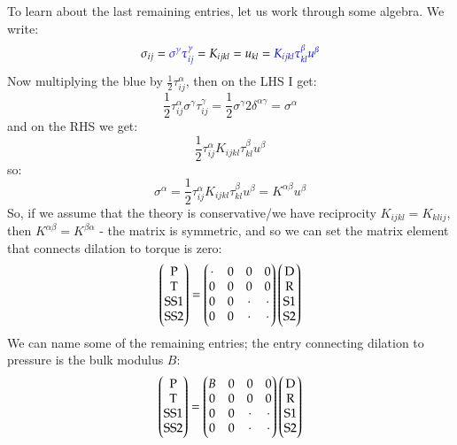 To learn about the last remaining entries, let us work through some algebra. We write:
\begin{equation}
    \sigma_{ij} = \textcolor{blue}{\sigma^\gamma \tau^\gamma_{ij}} = K_{ijkl} = u_{kl} = \textcolor{blue}{K_{ijkl}\tau^\beta_{kl}u^\beta}
\end{equation}
Now multiplying the blue by $\frac{1}{2}\tau^\alpha_{ij}$, then on the LHS I get:
\begin{equation}
    \frac{1}{2}\tau^\alpha_{ij}\sigma^\gamma \tau^\gamma_{ij} = \frac{1}{2}\sigma^\gamma 2\delta^{\alpha\gamma} = \sigma^\alpha
\end{equation}
and on the RHS we get:
\begin{equation}
    \frac{1}{2}\tau^\alpha_{ij} K_{ijkl}\tau^\beta_{kl}u^\beta
\end{equation}
so:
\begin{equation}
    \sigma^\alpha = \frac{1}{2}\tau^\alpha_{ij} K_{ijkl}\tau^\beta_{kl}u^\beta = K^{\alpha\beta}u^\beta
\end{equation}
So, if we assume that the theory is conservative/we have reciprocity $K_{ijkl} = K_{klij}$, then $K^{\alpha\beta} = K^{\beta\alpha}$ - the matrix is symmetric, and so we can set the matrix element that connects dilation to torque is zero:
\begin{equation}
    \begin{pmatrix}\text{P} \\ \text{T} \\ \text{SS1} \\ \text{SS2}\end{pmatrix} = \begin{pmatrix}\cdot & 0 & 0 & 0 \\ 0 & 0 & 0 & 0 \\ 0 & 0 & \cdot & \cdot \\ 0 & 0 & \cdot & \cdot\end{pmatrix}\begin{pmatrix}\text{D} \\ \text{R} \\ \text{S1} \\ \text{S2}\end{pmatrix}
\end{equation}
We can name some of the remaining entries; the entry connecting dilation to pressure is the bulk modulus $B$:
\begin{equation}
    \begin{pmatrix}\text{P} \\ \text{T} \\ \text{SS1} \\ \text{SS2}\end{pmatrix} = \begin{pmatrix}B & 0 & 0 & 0 \\ 0 & 0 & 0 & 0 \\ 0 & 0 & \cdot & \cdot \\ 0 & 0 & \cdot & \cdot\end{pmatrix}\begin{pmatrix}\text{D} \\ \text{R} \\ \text{S1} \\ \text{S2}\end{pmatrix}
\end{equation}
